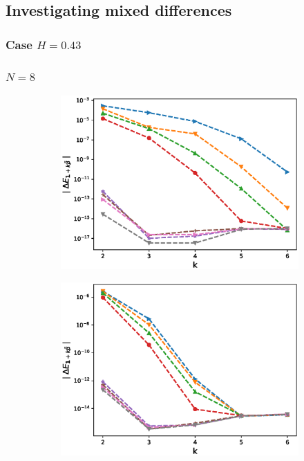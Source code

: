 \documentclass[11pt]{article}
\begin{document}
\newpage
\subsection{Investigating mixed differences }\label{sec:mixed differences rbergomi}

\subsubsection*{Case $H=0.43$}
\subsubsection*{$N=8$ }
\begin{figure}[h!]
	\centering
	\begin{subfigure}{.5\textwidth}
		\centering
		\includegraphics[width=1\linewidth]{./figures/mixed_diff_second_way/H_043/N_8/first_difference_rbergomi_8steps_H_043_K_1.eps}
		\caption{}
		\label{fig:sub3}
	\end{subfigure}%
	\begin{subfigure}{.5\textwidth}
		\centering
		\includegraphics[width=1\linewidth]{./figures/mixed_diff_second_way/H_043/N_8/first_difference_rbergomi_8steps_H_043_K_exp__4.eps}
		\caption{}
		\label{fig:sub4}
	\end{subfigure}
	

\end{figure}
\end{document}
